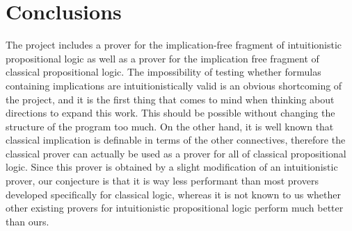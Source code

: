 \section{Conclusions}

The project includes a prover for the implication-free fragment of intuitionistic propositional logic as well as a prover for the implication free fragment of classical propositional logic. The impossibility of testing whether formulas containing implications are intuitionistically valid is an obvious shortcoming of the project, and it is the first thing that comes to mind when thinking about directions to expand this work. This should be possible without changing the structure of the program too much. On the other hand, it is well known that classical implication is definable in terms of the other connectives, therefore the classical prover can actually be used as a prover for all of classical propositional logic. Since this prover is obtained by a slight modification of an intuitionistic prover, our conjecture is that it is way less performant than most provers developed specifically for classical logic, whereas it is not known to us whether other existing provers for intuitionistic propositional logic perform much better than ours.
